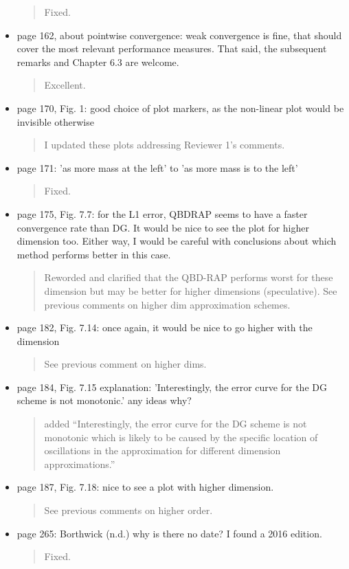 \documentclass[a4paper]{article}
\begin{document}
\begin{itemize}
\begin{quote}
    Fixed. 
\end{quote}
\item page 162, about pointwise convergence: weak convergence is fine, that should cover
the most relevant performance measures. That said, the subsequent remarks and
Chapter 6.3 are welcome.
\begin{quote}
    Excellent.
\end{quote}
\item page 170, Fig. 1: good choice of plot markers, as the non-linear plot would be
invisible otherwise
\begin{quote}
    I updated these plots addressing Reviewer 1's comments.
\end{quote}
\item {page 171: 'as more mass at the left' to 'as more mass is to the left'}
\begin{quote}
    Fixed. 
\end{quote}
\item {page 175, Fig. 7.7: for the L1 error, QBDRAP seems to have a faster convergence
rate than DG. It would be nice to see the plot for higher dimension too. Either
way, I would be careful with conclusions about which method performs better in
this case.}
\begin{quote}
    Reworded and clarified that the QBD-RAP performs worst for these dimension but may be better for higher dimensions (speculative). See previous comments on higher dim approximation schemes.
\end{quote}
\item page 182, Fig. 7.14: once again, it would be nice to go higher with the dimension
\begin{quote}
    See previous comment on higher dims.
\end{quote}
\item page 184, Fig. 7.15 explanation: 'Interestingly, the error curve for the DG scheme
is not monotonic.' any ideas why?
\begin{quote}
    added ``Interestingly, the error curve for the DG scheme is not monotonic which is likely to be caused by the specific location of oscillations in the approximation for different dimension approximations.''
\end{quote}
\item page 187, Fig. 7.18: nice to see a plot with higher dimension.
\begin{quote}
    See previous comments on higher order.
\end{quote}
\item {page 265: Borthwick (n.d.) why is there no date? I found a 2016 edition.}
\begin{quote}
    Fixed. 
\end{quote}
\end{itemize}




\end{document}
